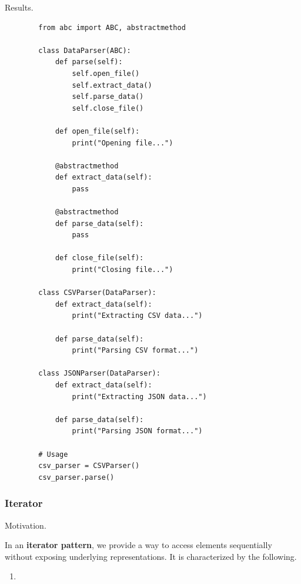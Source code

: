     Results. 

    \begin{example}
      \label{ex:data-parsing}
      \begin{lstlisting}
        from abc import ABC, abstractmethod

        class DataParser(ABC):
            def parse(self):
                self.open_file()
                self.extract_data()
                self.parse_data()
                self.close_file()
            
            def open_file(self):
                print("Opening file...")
            
            @abstractmethod
            def extract_data(self):
                pass
            
            @abstractmethod
            def parse_data(self):
                pass
            
            def close_file(self):
                print("Closing file...")

        class CSVParser(DataParser):
            def extract_data(self):
                print("Extracting CSV data...")
            
            def parse_data(self):
                print("Parsing CSV format...")

        class JSONParser(DataParser):
            def extract_data(self):
                print("Extracting JSON data...")
            
            def parse_data(self):
                print("Parsing JSON format...")

        # Usage
        csv_parser = CSVParser()
        csv_parser.parse() 
      \end{lstlisting}
    \end{example}

  \subsubsection{Iterator}

    Motivation. 

    \begin{definition}
      \label{def:iterator-pattern}
      In an \textbf{iterator pattern}, we provide a way to access elements sequentially without exposing underlying representations. It is characterized by the following. 
      \begin{enumerate}
        \item 
      \end{enumerate}
    \end{definition}

